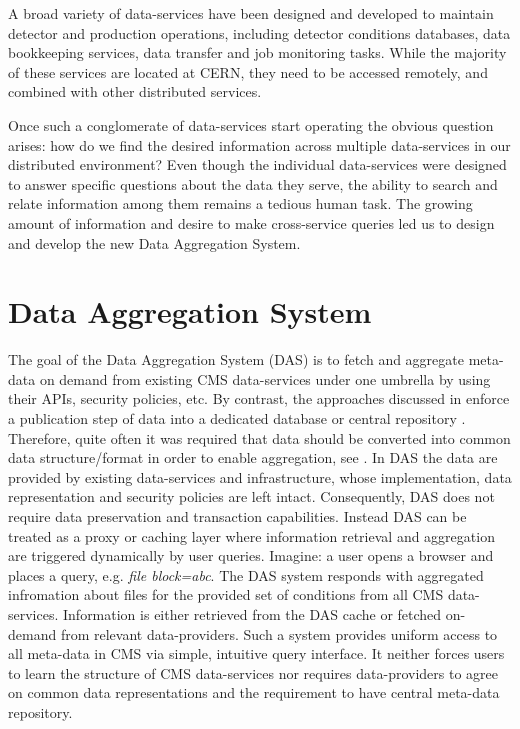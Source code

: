 \documentclass[3p,times]{elsarticle}
\begin{document}
A broad variety of data-services have been designed and developed to
maintain detector and production operations, including detector
conditions databases, data bookkeeping services,
data transfer and job monitoring tasks. While the majority of these
services are located at CERN, they need to be accessed remotely, and
combined with other distributed services.

Once such a conglomerate of data-services start operating the obvious
question arises: how do we find the desired information across multiple data-services
in our distributed environment? Even though the individual data-services were designed
to answer specific questions about the data they serve, the ability to search and relate
information among them remains a tedious human task. The growing amount of information
and desire to make cross-service queries led us to design and develop the new
Data Aggregation System.

\section{Data Aggregation System\label{DAS}}
The goal of the Data Aggregation System (DAS) is to fetch and aggregate meta-data 
on demand from existing CMS data-services under one umbrella by using their APIs, 
security policies, etc. By contrast, the approaches
discussed in \cite{DBXplorer, QueryAnswer, FedDB}
enforce a publication step of data into a dedicated database 
or central repository \cite{iRODS}. Therefore, quite often it was required
that data should be converted into common data structure/format in order to enable
aggregation, see \cite{OpenArchive}. In DAS the data are provided
by existing data-services and infrastructure, whose implementation,
data representation and security policies are left intact. Consequently,
DAS does not require data preservation and transaction capabilities. 
Instead DAS can be treated as a proxy or caching layer where information 
retrieval and aggregation are triggered dynamically by user queries. 
Imagine: a user opens a browser and places a query, e.g.
{\it file block=abc}. The DAS system responds with aggregated infromation about files
for the provided set of conditions from all CMS data-services. Information
is either retrieved from the DAS cache or fetched on-demand from relevant
data-providers. Such a system provides uniform access to all meta-data in CMS 
via simple, intuitive query interface. It neither forces users to learn 
the structure of CMS data-services
nor requires data-providers to agree on common data representations
and the requirement to have central meta-data repository.
\end{document}
